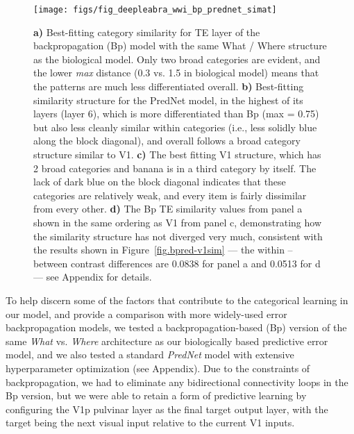 \documentclass[11pt,twoside]{article}
\newif\myifpdf
\begin{document}
\begin{figure}
  \centering\texttt{[image: figs/fig\_deepleabra\_wwi\_bp\_prednet\_simat]}
  \caption{\footnotesize {\bf a)} Best-fitting category similarity for TE layer of the backpropagation (Bp) model with the same What / Where structure as the biological model.  Only two broad categories are evident, and the lower \emph{max} distance (0.3 vs. 1.5 in biological model) means that the patterns are much less differentiated overall.  {\bf b)} Best-fitting similarity structure for the PredNet model, in the highest of its layers (layer 6), which is more differentiated than Bp (max = 0.75) but also less cleanly similar within categories (i.e., less solidly blue along the block diagonal), and overall follows a broad category structure similar to V1. {\bf c)} The best fitting V1 structure, which has 2 broad categories and banana is in a third category by itself.  The lack of dark blue on the block diagonal indicates that these categories are relatively weak, and every item is fairly dissimilar from every other.  {\bf d)} The Bp TE similarity values from panel a shown in the same ordering as V1 from panel c, demonstrating how the similarity structure has not diverged very much, consistent with the results shown in Figure~\ref{fig.bpred-v1sim} --- the within -- between contrast differences are 0.0838 for panel a and 0.0513 for d --- see Appendix for details.}
  \label{fig.bpred}
\end{figure}

To help discern some of the factors that contribute to the categorical learning in our model, and provide a comparison with more widely-used error backpropagation models, we tested a backpropagation-based (Bp) version of the same \emph{What} vs. \emph{Where} architecture as our biologically based predictive error model, and we also tested a standard \emph{PredNet} model \citep{LotterKreimanCox16} with extensive hyperparameter optimization (see Appendix).  Due to the constraints of backpropagation, we had to eliminate any bidirectional connectivity loops in the Bp version, but we were able to retain a form of predictive learning by configuring the V1p pulvinar layer as the final target output layer, with the target being the next visual input relative to the current V1 inputs.
\end{document}

